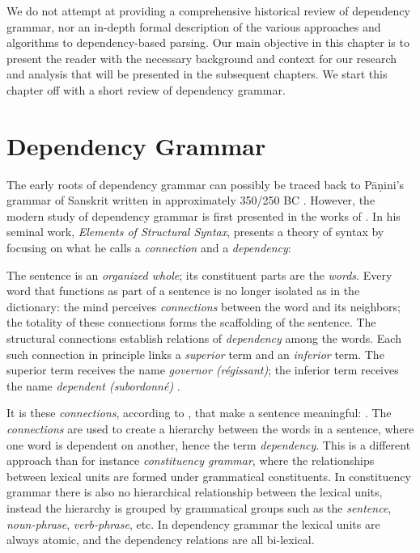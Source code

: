 We do not attempt at providing a comprehensive historical review of dependency grammar, nor an in-depth formal description of the various approaches and algorithms to dependency-based parsing. Our main objective in this chapter is to present the reader with the necessary background and context for our research and analysis that will be presented in the subsequent chapters. We start this chapter off with a short review of dependency grammar.

\section{Dependency Grammar}
\label{grammar}

The early roots of dependency grammar can possibly be traced back to P\={a}\d{n}ini's grammar of Sanskrit written in approximately 350/250 BC \cite{Kruijff:02}. However, the modern study of  dependency grammar is first presented in the works of \citeauthor{Tes:15}. In his seminal work, \textit{Elements of Structural Syntax}, \citeauthor{Tes:15} presents a theory of syntax by focusing on what he calls a \textit{connection} and a \textit{dependency}:

\begin{displayquote}
The sentence is an \textit{organized whole}; its constituent parts are the \textit{words}. Every word that functions as part of a sentence is no longer isolated as in the dictionary: the mind perceives \textit{connections} between the word and its neighbors; the totality of these connections forms the scaffolding of the sentence. The structural connections establish relations of \textit{dependency} among the words. Each such connection in principle links a \textit{superior} term and an \textit{inferior} term. The superior term receives the name \textit{governor (r\'{e}gissant)}; the inferior term receives the name \textit{dependent (subordonn\'{e})} \cite{Tes:15}.
\end{displayquote}

It is these \textit{connections}, according to \citeauthor{Tes:15}, that make a sentence meaningful:  \cite{Tes:15}. The \textit{connections} are used to create a hierarchy between the words in a sentence, where one word is dependent on another, hence the term \textit{dependency}. This is a different approach than for instance \textit{constituency grammar}, where the relationships between lexical units are formed under grammatical constituents. In constituency grammar there is also no hierarchical relationship between the lexical units, instead the hierarchy is grouped by grammatical groups such as the \textit{sentence}, \textit{noun-phrase}, \textit{verb-phrase}, etc. In dependency grammar the lexical units are always atomic, and the dependency relations are all bi-lexical.

